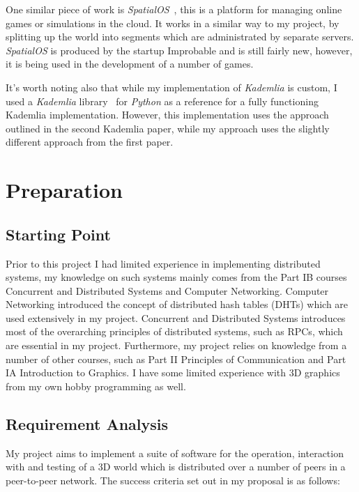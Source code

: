 \documentclass[12pt,notitlepage,a4paper]{report}
\newcommand{\python}{\emph{Python}}
\newcommand{\kademlia}{\emph{Kademlia}}
\begin{document}
	One similar piece of work is \emph{SpatialOS}~\cite{SpatialOS}, this is a platform for managing online games or simulations in the cloud. It works in a similar way to my project, by splitting up the world into segments which are administrated by separate servers. \emph{SpatialOS} is produced by the startup Improbable and is still fairly new, however, it is being used in the development of a number of games.
	
	It's worth noting also that while my implementation of \kademlia{} is custom, I used a \kademlia{} library~\cite{pykademlia} for \python{} as a reference for a fully functioning Kademlia implementation. However, this implementation uses the approach outlined in the second Kademlia paper, while my approach uses the slightly different approach from the first paper.
	
	\clearpage
	\chapter{Preparation}
	
	\section{Starting Point}
	Prior to this project I had limited experience in implementing distributed systems, my knowledge on such systems mainly comes from the Part IB courses Concurrent and Distributed Systems and Computer Networking. Computer Networking introduced the concept of distributed hash tables (DHTs) which are used extensively in my project. Concurrent and Distributed Systems introduces most of the overarching principles of distributed systems, such as RPCs, which are essential in my project. Furthermore, my project relies on knowledge from a number of other courses, such as Part II Principles of Communication and Part IA Introduction to Graphics. I have some limited experience with 3D graphics from my own hobby programming as well.
	
	\section{Requirement Analysis}
	\label{sec:req}
	My project aims to implement a suite of software for the operation, interaction with and testing of a 3D world which is distributed over a number of peers in a peer-to-peer network. The success criteria set out in my proposal is as follows:
	
\end{document}
